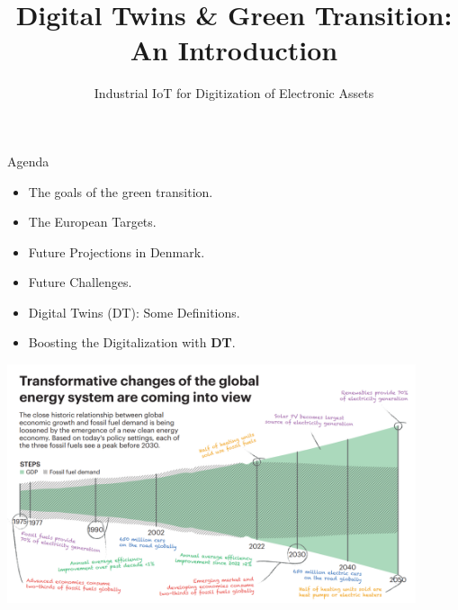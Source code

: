 \documentclass[aspectratio=169,hyperref={pdfpagelabels=false}]{beamer}
\subtitle{\normalsize{Industrial IoT for Digitization of Electronic Assets}}
\title{Digital Twins \& Green Transition: An Introduction}
\begin{document}
\inserttitlepage

\begin{frame}{Agenda}
  \begin{itemize}
    \item The goals of the green transition.
    \item The European Targets.
    \item Future Projections in Denmark.
    \item Future Challenges.
    \item Digital Twins (DT): Some Definitions.
    \item Boosting the Digitalization with \textbf{DT}.
  \end{itemize}
\end{frame}

\begin{frame}{}

  \includegraphics[width=0.9\textwidth]{img/pic0.png} 
  \let\thefootnote\relax{}
    \end{frame}
\end{document}
